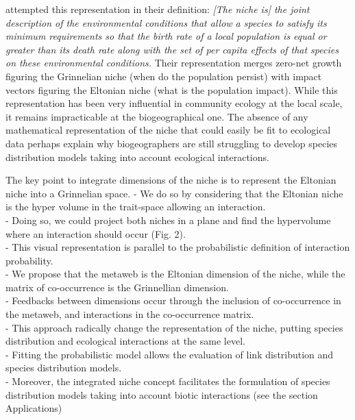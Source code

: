 \documentclass[12pt]{article}
\begin{document}
\textcite{Chase2003} attempted this representation in their definition:
\textit{[The niche is] the joint description of the environmental conditions
that allow a species to satisfy its minimum requirements so that the birth rate
of a local population is equal or greater than its death rate along with the
set of per capita effects of that species on these environmental conditions.}
Their representation merges zero-net growth figuring the Grinnelian niche
(when do the population persist) with impact vectors figuring the Eltonian
niche (what is the population impact). While this representation has been very
influential in community ecology at the local scale, it remains impracticable
at the biogeographical one. The absence of any mathematical representation
of the niche that could easily be fit to ecological data perhaps explain why
biogeographers are still struggling to develop species distribution models
taking into account ecological interactions.

The key point to integrate dimensions of the niche is to represent the Eltonian niche into a Grinnelian space. 
- We do so by considering that the Eltonian niche is the hyper volume in the trait-space allowing an interaction. \\
- Doing so, we could project both niches in a plane and find the hypervolume where an interaction should occur (Fig. 2). \\
- This visual representation is parallel to the probabilistic definition of interaction probability. \\
- We propose that the metaweb is the Eltonian dimension of the niche, while the matrix of co-occurrence is the Grinnellian dimension. \\
- Feedbacks between dimensions occur through the inclusion of co-occurrence in the metaweb, and interactions in the co-occurrence matrix. \\
- This approach radically change the representation of the niche, putting species distribution and ecological interactions at the same level. \\
- Fitting the probabilistic model allows the evaluation of link distribution and species distribution models. \\
- Moreover, the integrated niche concept facilitates the formulation of species distribution models taking into account biotic interactions (see the section Applications) \\

\end{document}
